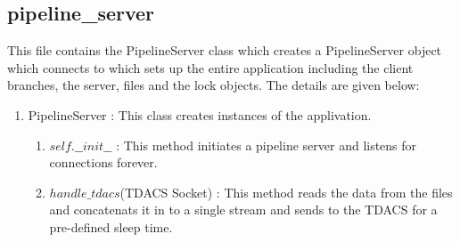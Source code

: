 \subsection{pipeline\_server}
This file contains the PipelineServer class which creates a PipelineServer
object which connects to which sets up the entire application including the
client branches, the server, files and the lock objects. The details are given
below:
\begin{enumerate}
	\item PipelineServer : This class creates instances of the applivation.
		\begin{enumerate}
		\item $self.\_\_init\_\_$ : This method initiates a pipeline server and
			listens for connections forever.
		\item $handle\_tdacs$(TDACS Socket) : This method reads the data from
			the files and concatenats it in to a single stream and sends to the
			TDACS for a pre-defined sleep time.
		\end{enumerate}
\end{enumerate}

